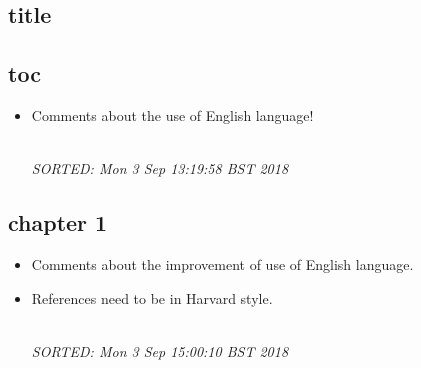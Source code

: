 \documentclass[10pt]{article}
\begin{document}
\subsection{title}




\subsection{toc}

\begin{itemize}[noitemsep,topsep=0pt]
\item Comments about the use of English language!

\textit{
\\
SORTED:  Mon  3 Sep 13:19:58 BST 2018
}

\end{itemize}

\subsection{chapter 1}

\begin{itemize}[noitemsep,topsep=0pt]
\item Comments about the improvement of use of English language. \\

\item References need to be in Harvard style. 

\textit{
\\
SORTED:  Mon  3 Sep 15:00:10 BST 2018
}



\end{itemize}
\end{document}
